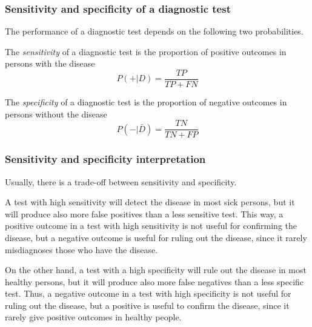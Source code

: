 \begin{frame}
\frametitle{Sensitivity and specificity of a diagnostic test}
The performance of a diagnostic test depends on the following two probabilities.
\begin{definition}[Sensitivity]
The \emph{sensitivity} of a diagnostic test is the proportion of positive outcomes in persons with the disease 
\[
P(+|D)=\frac{TP}{TP+FN}
\]
\end{definition}

\begin{definition}[Specificity]
The \emph{specificity} of a diagnostic test is the proportion of negative outcomes in persons without the disease
\[
P(-|\bar D)=\frac{TN}{TN+FP}
\]
\end{definition}
\end{frame}


\begin{frame}
\frametitle{Sensitivity and specificity interpretation}
Usually, there is a trade-off between sensitivity and specificity.  

A test with high sensitivity will detect the disease in most sick persons, but it will produce also more false positives
than a less sensitive test. 
This way, a positive outcome in a test with high sensitivity is not useful for confirming the disease, but a negative
outcome is useful for ruling out the disease, since it rarely misdiagnoses those who have the disease.

On the other hand, a test with a high specificity will rule out the disease in most healthy persons, but it will produce
also more false negatives than a less specific test. 
Thus, a negative outcome in a test with high specificity is not useful for ruling out the disease, but a positive is
useful to confirm the disease, since it rarely give positive outcomes in healthy people.  
\end{frame}


